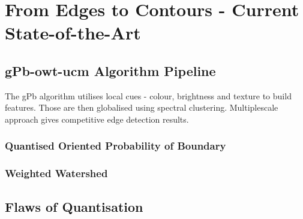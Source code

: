 \chapter{From Edges to Contours - Current State-of-the-Art}
\label{Chapter2}
\section{gPb-owt-ucm Algorithm Pipeline}
The gPb algorithm utilises local cues - colour, brightness and texture to build features. Those are then globalised using spectral clustering. Multiplescale approach gives competitive edge detection results.

\subsection{Quantised Oriented Probability of Boundary}
\subsection{Weighted Watershed}
\section{Flaws of Quantisation}
